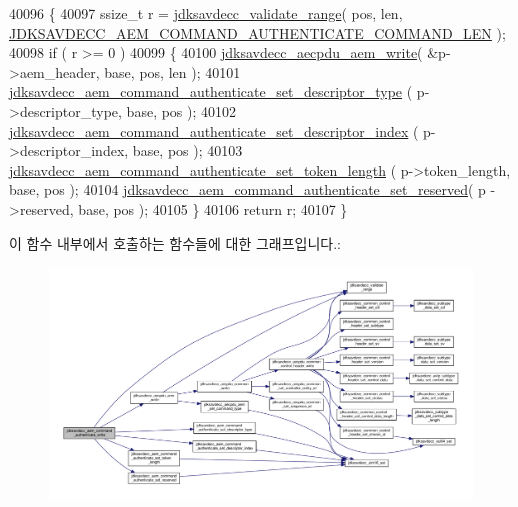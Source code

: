\begin{DoxyCode}
40096 \{
40097     ssize\_t r = \hyperlink{group__util_ga9c02bdfe76c69163647c3196db7a73a1}{jdksavdecc\_validate\_range}( pos, len, 
      \hyperlink{group__command__authenticate_ga4fc8006ff44cdde3e0c193973f0e4831}{JDKSAVDECC\_AEM\_COMMAND\_AUTHENTICATE\_COMMAND\_LEN} );
40098     \textcolor{keywordflow}{if} ( r >= 0 )
40099     \{
40100         \hyperlink{group__aecpdu__aem_gad658e55771cce77cecf7aae91e1dcbc5}{jdksavdecc\_aecpdu\_aem\_write}( &p->aem\_header, base, pos, len );
40101         \hyperlink{group__command__authenticate_ga482382acdfff24eaf915502ce4d5ae75}{jdksavdecc\_aem\_command\_authenticate\_set\_descriptor\_type}
      ( p->descriptor\_type, base, pos );
40102         \hyperlink{group__command__authenticate_gaa28e92d7200435a04569083ac362f4b7}{jdksavdecc\_aem\_command\_authenticate\_set\_descriptor\_index}
      ( p->descriptor\_index, base, pos );
40103         \hyperlink{group__command__authenticate_gadac2376c5bfbabed04c519a0563bb83d}{jdksavdecc\_aem\_command\_authenticate\_set\_token\_length}
      ( p->token\_length, base, pos );
40104         \hyperlink{group__command__authenticate_gaf13f88d40fd1495d07317425b62c42f5}{jdksavdecc\_aem\_command\_authenticate\_set\_reserved}( p
      ->reserved, base, pos );
40105     \}
40106     \textcolor{keywordflow}{return} r;
40107 \}
\end{DoxyCode}


이 함수 내부에서 호출하는 함수들에 대한 그래프입니다.\+:
\nopagebreak
\begin{figure}[H]
\begin{center}
\leavevmode
\includegraphics[width=350pt]{group__command__authenticate_gad9f91fe52de0dc2859fec3f593d704fb_cgraph}
\end{center}
\end{figure}


